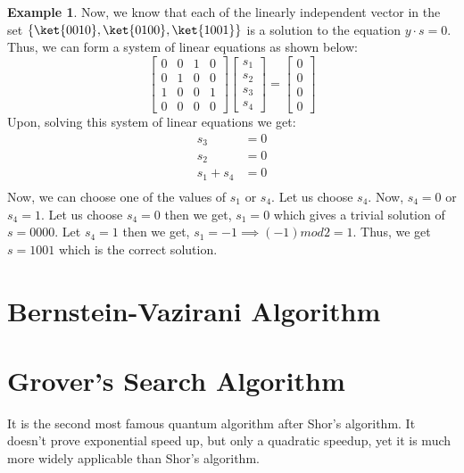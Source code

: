 \documentclass[12pt, oneside]{book}
\theoremstyle{definition}
\theoremstyle{definition}
\newtheorem{example}{Example}[section]
\theoremstyle{remark}
\begin{document}
\begin{example}
    Now, we know that each of the linearly independent vector in the set $\{\ket{0010},\ket{0100},\ket{1001}\}$ is a solution to the equation $y\cdot s=0$. Thus, we can form a system of linear equations as shown below:
    \[
    \begin{bmatrix}
        0 & 0 & 1 & 0 \\
        0 & 1 & 0 & 0 \\
        1 & 0 & 0 & 1 \\
        0 & 0 & 0 & 0
    \end{bmatrix}
    \begin{bmatrix}
        s_1 \\
        s_2 \\
        s_3 \\
        s_4 
    \end{bmatrix}
    =
    \begin{bmatrix}
        0 \\
        0 \\
        0 \\
        0
    \end{bmatrix}
    \]
    Upon, solving this system of linear equations we get:
    \begin{align*}
    s_3&=0 \\
    s_2&=0 \\
    s_1 + s_4 &=0 \\
    \end{align*}
    Now, we can choose one of the values of $s_1$ or $s_4$. Let us choose $s_4$.
    Now, $s_4=0$ or $s_4=1$. 
    Let us choose $s_4=0$ then we get, $s_1=0$ which gives a trivial solution of $s=0000$. Let $s_4=1$ then we get, $s_1=-1\implies (-1) mod 2=1$.
    Thus, we get $s=1001$ which is the correct solution.
\end{example}



\chapter{Bernstein-Vazirani Algorithm}

\chapter{Grover's Search Algorithm}
It is the second most famous quantum algorithm after Shor's algorithm.
It doesn't prove exponential speed up, but only a quadratic speedup, yet it is much more
widely applicable than Shor's algorithm.
\end{document}
